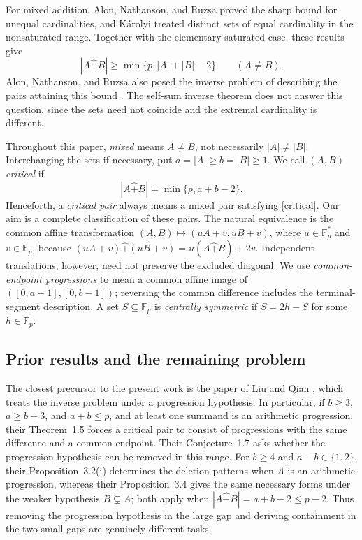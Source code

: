 \documentclass[10pt,a4paper]{amsart}
\newcommand{\F}{\mathbb{F}_p}
\newcommand{\rs}{\mathbin{\widehat+}}
\begin{document}
For mixed addition, Alon, Nathanson, and Ruzsa \cite{ANR95,ANR96}
proved the sharp bound for unequal cardinalities, and K\'arolyi
\cite{KarolyiExceptional} treated distinct sets of equal cardinality
in the nonsaturated range.  Together with the
elementary saturated case, these results give
\begin{equation}\label{anr}
 |A\rs B|\ge\min\{p,|A|+|B|-2\}\qquad(A\ne B).
\end{equation}
Alon, Nathanson, and Ruzsa also posed the inverse problem of describing
the pairs attaining this bound \cite[Section 5, item 4]{ANR96}.  The self-sum inverse theorem
does not answer this question, since the sets need not coincide and the
extremal cardinality is different.

Throughout this paper, \emph{mixed} means $A\ne B$, not necessarily
$|A|\ne|B|$.  Interchanging the sets if necessary, put
$a=|A|\ge b=|B|\ge1$.  We call $(A,B)$ \emph{critical} if
\begin{equation}\label{critical}
 |A\rs B|=\min\{p,a+b-2\}.
\end{equation}
Henceforth, a \emph{critical pair} always means a mixed pair satisfying \eqref{critical}.
Our aim is a complete classification of these pairs.  The natural
equivalence is the common affine transformation
$ (A,B)\mapsto(uA+v,uB+v)$, where $u\in\F^*$ and $v\in\F$, because
$(uA+v)\rs(uB+v)=u(A\rs B)+2v$.  Independent translations, however, need not preserve the excluded
diagonal.  We use
\emph{common-endpoint progressions} to mean a common affine image of
$([0,a-1],[0,b-1])$; reversing the common difference includes the
terminal-segment description.  A set $S\subseteq\F$ is
\emph{centrally symmetric} if $S=2h-S$ for some $h\in\F$.

\subsection{Prior results and the remaining problem}

The closest precursor to the present work is the paper of Liu and Qian
\cite{LQ}, which treats the inverse problem under a progression
hypothesis.  In particular, if $b\ge3$, $a\ge b+3$, and $a+b\le p$,
and at least one summand is an arithmetic progression, their
Theorem~1.5 forces a critical pair to consist of progressions with the
same difference and a common endpoint.  Their Conjecture~1.7 asks whether
the progression hypothesis can be removed in this range.
For $b\ge4$ and $a-b\in\{1,2\}$, their Proposition~3.2(i) determines
the deletion patterns when $A$ is an arithmetic progression, whereas
their Proposition~3.4 gives the same necessary forms under the weaker
hypothesis $B\subsetneq A$; both apply when
$|A\rs B|=a+b-2\le p-2$.
Thus removing the progression hypothesis in the large gap and deriving
containment in the two small gaps are genuinely different tasks.
\end{document}
